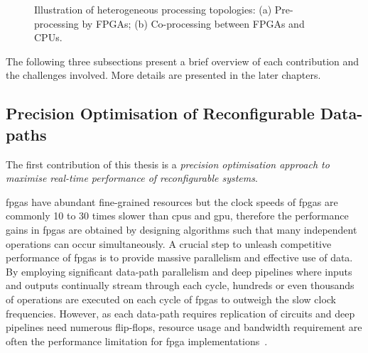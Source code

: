 \setcounter{subfigure}{0}
\begin{figure}[t!]
\centering
{}
\caption{Illustration of heterogeneous processing topologies: (a) Pre-processing by FPGAs; (b) Co-processing between FPGAs and CPUs.}
\label{fig:het_arch}
\end{figure}

The following three subsections present a brief overview of each contribution and the challenges involved.
More details are presented in the later chapters.

\subsection{Precision Optimisation of Reconfigurable Data-paths}

The first contribution of this thesis is a \textit{precision optimisation approach to maximise real-time performance of reconfigurable systems}.

\glspl{fpga} have abundant fine-grained resources but the clock speeds of \glspl{fpga} are commonly 10 to 30 times slower than \glspl{cpu} and \gls{gpu},
therefore the performance gains in \glspl{fpga} are obtained by designing algorithms such that many independent operations can occur simultaneously.
A crucial step to unleash competitive performance of \glspl{fpga} is to provide massive parallelism and effective use of data.
By employing significant data-path parallelism and deep pipelines where inputs and outputs continually stream through each cycle, hundreds or even thousands of operations are executed on each cycle of \glspl{fpga} to outweigh the slow clock frequencies.
However, as each data-path requires replication of circuits and deep pipelines need numerous flip-flops, resource usage and bandwidth requirement are often the performance limitation for \gls{fpga} implementations~\cite{stitt11}.

